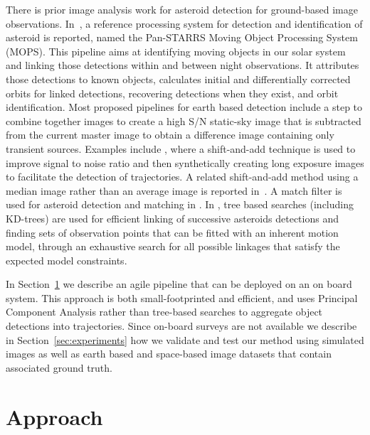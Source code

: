 \documentclass{article}
\begin{document}
There is prior image analysis work for asteroid detection for ground-based image observations. In~\cite{denneau2013pan}, a reference processing system for detection and identification of asteroid is reported, named the Pan-STARRS Moving Object Processing System (MOPS). This pipeline aims at identifying moving objects in our solar system and linking those detections within and between night observations. It attributes those detections to known objects, calculates initial and differentially corrected orbits for linked detections, recovering detections when they exist, and orbit identification. Most proposed pipelines for earth based detection include a step to combine together images to create a high S/N static-sky image that is subtracted from the current master image to obtain a difference image containing only transient sources. Examples include \cite{shao2014finding}, where a shift-and-add technique is used to improve  signal to noise ratio and then synthetically creating long exposure images to facilitate the detection of trajectories. A related shift-and-add method using a median  image rather than an average image is reported in~\cite{yanagisawa2005automatic}. A match filter is used for asteroid detection and matching in \cite{gural2005matched}. In \cite{kubica2005variable,kubica2005multiple,kubica2007efficient}, tree based searches (including KD-trees) are used for efficient linking of successive asteroids detections and finding sets of observation points that can be fitted with an inherent motion model, through an exhaustive search for all possible linkages that satisfy the expected model constraints.
	
In Section~\ref{sec:approach} we describe an agile pipeline that can be deployed on an on board system. This approach is both small-footprinted and efficient, and uses Principal Component Analysis rather than tree-based searches to aggregate object detections into trajectories. Since on-board surveys are not available we describe in Section~\ref{sec:experiments} how we validate and test our method using simulated images as well as earth based and space-based image datasets that contain associated ground truth.

\section{Approach}
\label{sec:approach}
\end{document}
